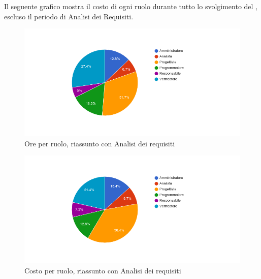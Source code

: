 Il seguente grafico mostra il costo di ogni ruolo durante tutto lo svolgimento del , escluso il periodo di Analisi dei Requisiti.

\begin{figure}[H]
  \begin{center}
    \includegraphics[width=15cm]{res/img/prospettoEconomico/orePerRuoloRiassuntoConAnalisi.png}
  \caption{Ore per ruolo, riassunto  con Analisi dei requisiti}
  \end{center} 
\end{figure}  

\begin{figure}[H]
  \begin{center}
    \includegraphics[width=15cm]{res/img/prospettoEconomico/costoPerRuoloRiassuntoConAnalisi.png}
  \caption{Costo per ruolo, riassunto  con Analisi dei requisiti}
  \end{center} 
\end{figure}  


